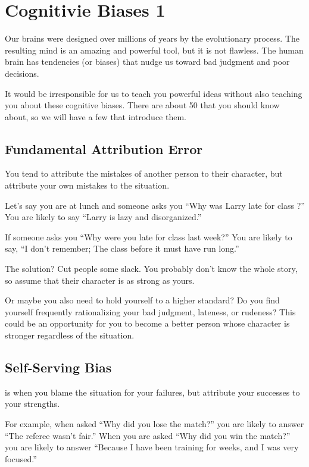 \chapter{Cognitivie Biases 1}


Our brains were designed over millions of years by the evolutionary
process. The resulting mind is an amazing and powerful tool, but it is
not flawless. The human brain has tendencies (or biases) that nudge us
toward bad judgment and poor decisions.

It would be irresponsible for us to teach you powerful ideas without
also teaching you about these cognitive biases. There are about 50
that you should know about, so we will have a few that introduce them.

\section{Fundamental Attribution Error}

You tend to attribute
the mistakes of another person to their character, but attribute your
own mistakes to the situation.

Let's say you are at lunch and someone asks you ``Why was Larry late
for class ?''  You are likely to say ``Larry is lazy
and disorganized.''

If someone asks you ``Why were you late for class last week?''  You
are likely to say, ``I don't remember; The class before it must have
run long.''

The solution? Cut people some slack. You probably don't know the whole
story, so assume that their character is as strong as yours.

Or maybe you also need to hold yourself to a higher standard? Do you find
yourself frequently rationalizing your bad judgment, lateness, or
rudeness?  This could be an opportunity for you to become a better
person whose character is stronger regardless of the situation.

\section{Self-Serving Bias}

 is when you blame the situation for your
failures, but attribute your successes to your strengths.

For example, when asked ``Why did you lose the match?'' you are likely
to answer ``The referee wasn't fair.''  When you are asked ``Why did
you win the match?'' you are likely to answer ``Because I have been
training for weeks, and I was very focused.''

